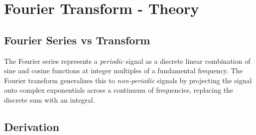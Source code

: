 \section{Fourier Transform - Theory}

\subsection{Fourier Series vs Transform}

The Fourier series represents a \textit{periodic} signal as a discrete linear combination of 
sine and cosine functions at integer multiples of a fundamental frequency.
The Fourier transform generalizes this to \textit{non-periodic} signals by projecting 
the signal onto complex exponentials across a continuum of frequencies,
replacing the discrete sum with an integral.

\subsection{Derivation}

